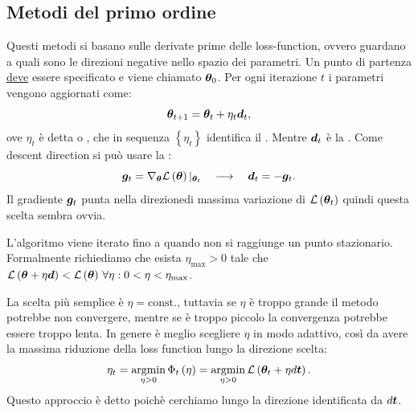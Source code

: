 \documentclass[10pt]{article}
\begin{document}
\subsection{Metodi del primo ordine}
    Questi metodi si basano sulle derivate prime delle loss-function, ovvero guardano
    a quali sono le direzioni negative nello spazio dei parametri. Un punto di partenza
    \underline{deve} essere specificato e viene chiamato \( \bm{\theta}_0 \).
    Per ogni iterazione \(t\) i parametri vengono aggiornati come:
    \begin{equation}
        \bm{\theta}_{t+1} = \bm{\theta}_t + \eta_t \bm{d}_t,
    \end{equation}
    ove \( \eta_t \) è detta  o , che in
    sequenza \( \left\{ \eta_t \right\} \) identifica il . Mentre \( \bm{d}_t \) è la . Come descent
    direction si può usare la :
    \begin{equation}\label{eq:steepest descent}
        \bm{g}_t = \nabla_{\bm{\theta}} \mathcal{L}\left( \bm{\theta} \right)|_{\bm{\theta}_t} \quad \longrightarrow \quad  \bm{d}_t = -\bm{g}_t.
    \end{equation}
    Il gradiente \( \bm{g}_t \) punta nella
    direzionedi massima variazione di \( \mathcal{L}\left( \bm{\theta}_t \right) \)
    quindi questa scelta sembra ovvia.

    L'algoritmo viene iterato fino a quando non si raggiunge un punto stazionario.
    Formalmente richiediamo che esista \( \eta_{\text{max}} > 0 \) tale che
    \( \mathcal{L} \left( \bm{\theta} + \eta\bm{d} \right) < \mathcal{L}\left( \bm{\theta} \right) \,
    \forall\eta : 0<\eta<\eta_{\text{max}}  \). 

    La scelta più semplice è \( \eta = \text{const.} \), tuttavia se \( \eta \) è troppo grande
    il metodo potrebbe non convergere, mentre se è troppo piccolo la convergenza potrebbe
    essere troppo lenta. In genere è meglio scegliere \( \eta \) in modo adattivo, così da
    avere la massima riduzione della loss function lungo la direzione scelta:
    \begin{equation}
        \eta_t = \operatorname*{argmin}_{\eta > 0} \Phi_t \left( \eta \right) = \operatorname*{argmin}_{\eta > 0}\mathcal{L} \left( \bm{\theta}_t + \eta d\bm{t} \right).
    \end{equation}
    Questo approccio è detto  poichè cerchiamo lungo la direzione
    identificata da \( d\bm{t} \).
\end{document}

